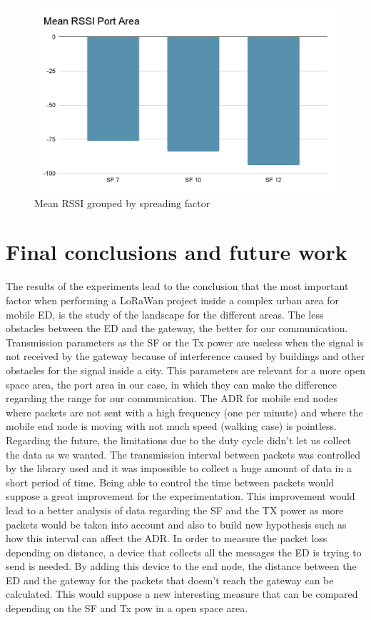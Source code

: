 \begin{figure}[htpb]
\includegraphics[width=\linewidth]{rssiSpreading.png}
\caption{Mean RSSI grouped by spreading factor}
\label{conc:rssiSp}
\end{figure}

\section{Final conclusions and future work}

The results of the experiments lead to the conclusion that the most important factor when performing a LoRaWan project inside a complex urban area for mobile ED, is the study of the landscape for the different areas. The less obstacles between the ED and the gateway, the better for our communication.
Transmission parameters as the SF or the Tx power are useless when the signal is not received by the gateway because of interference caused by buildings and other obstacles for the signal inside a city. This parameters are relevant for a more open space area, the port area in our case, in which they can make the difference regarding the range for our communication.
The ADR for mobile end nodes where packets are not sent with a high frequency (one per minute) and where the mobile end node is moving with not much speed (walking case) is pointless.
Regarding the future, the limitations due to the duty cycle didn't let us collect the data as we wanted. The transmission interval between packets was controlled by the library used and it was impossible to collect a huge amount of data in a short period of time. Being able to control the time between packets would suppose a great improvement for the experimentation. This improvement would lead to a better analysis of  data regarding the SF and the TX power as more packets would be taken into account and also to build new hypothesis such as how this interval can affect the ADR. 
In order to measure the packet loss depending on distance, a device that collects all the messages the ED is trying to send is needed. By adding this device to the end node, the distance between the ED and the gateway for the packets that doesn't reach the gateway can be calculated. This would suppose a new interesting measure that can be compared depending on the SF and Tx pow in a open space area.




